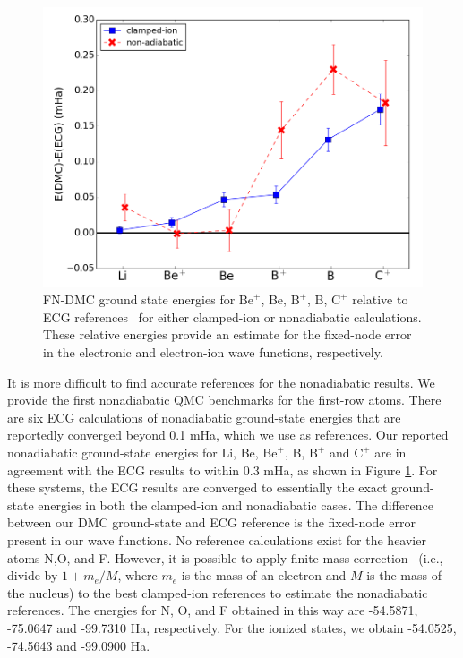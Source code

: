 \documentclass[aip,jcp,numerical,reprint]{revtex4-1}
\begin{document}
\begin{figure}[h]
\centering
\includegraphics[scale=.4]{atom-ECG}
\caption{FN-DMC ground state energies for $\text{Be}^+$, Be, $\text{B}^+$, B, $\text{C}^+$ relative to ECG references~\cite{Stanke_Be,Puchalski_Be+,Bubin_BeH_noBO,Bubin_B,Bubin_B+,Bubin_C+} for either clamped-ion or nonadiabatic calculations. These relative energies provide an estimate for the fixed-node error in the electronic and electron-ion wave functions, respectively.\label{fig:atom-ECG}}
\end{figure}

It is more difficult to find accurate references for the nonadiabatic results. We provide the first nonadiabatic QMC benchmarks for the first-row atoms. There are six ECG calculations of nonadiabatic ground-state energies that are reportedly converged beyond 0.1 mHa, which we use as references. Our reported nonadiabatic ground-state energies for Li, Be, $\text{Be}^+$, B, $\text{B}^+$ and $\text{C}^+$ are in agreement with the ECG results to within 0.3 mHa, as shown in Figure \ref{fig:atom-ECG}. For these systems, the ECG results are converged to essentially the exact ground-state energies in both the clamped-ion and nonadiabatic cases. The difference between our DMC ground-state and ECG reference is the fixed-node error present in our wave functions. No reference calculations exist for the heavier atoms N,O, and F. However, it is possible to apply finite-mass correction~\cite{Davidson_Atoms,Cencek_LiH} (i.e., divide by $1+m_e/M$, where $m_e$ is the mass of an electron and $M$ is the mass of the nucleus) to the best clamped-ion references to estimate the nonadiabatic references. The energies for N, O, and F obtained in this way are -54.5871, -75.0647 and -99.7310 Ha, respectively. For the ionized states, we obtain -54.0525, -74.5643 and -99.0900 Ha. %
\end{document}
